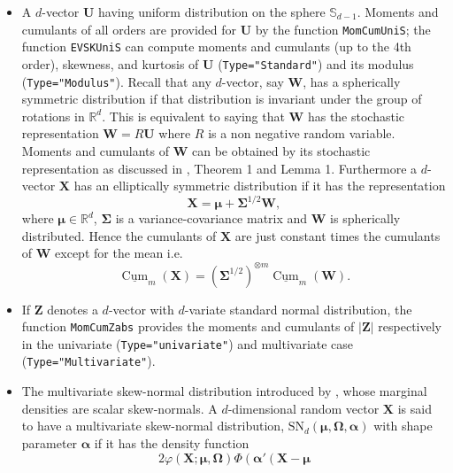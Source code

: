 \begin{itemize}
\item
  A \(d\)-vector \(\mathbf{U}\) having uniform distribution on the sphere \(\mathbb{S}_{d-1}\). Moments and cumulants of all orders are provided for \(\mathbf{U}\) by the function \texttt{MomCumUniS}; the function \texttt{EVSKUniS} can compute moments and cumulants (up to the 4th order), skewness, and kurtosis of \(\mathbf{U}\) (\texttt{Type="Standard"}) and its modulus (\texttt{Type="Modulus"}).
  Recall that any \(d\)-vector, say \(\mathbf{W}\), has a spherically symmetric distribution
  if that distribution is invariant under the group of rotations in
  \(\mathbb{R}^{d}\). This is equivalent to saying that \(\mathbf{W}\) has the
  stochastic representation \(\mathbf{W}=R\mathbf{U}\)
  where \(R\) is a non negative random variable. Moments and cumulants of \(\mathbf{W}\) can be obtained by its stochastic representation as discussed in \citet{jamma2021San}, Theorem 1 and Lemma 1. Furthermore a \(d\)-vector \(\mathbf{X}\) has an elliptically symmetric distribution if it has the representation
  \[
  \mathbf{X}=\boldsymbol{\mu}+\boldsymbol{\Sigma}^{1/2}\mathbf{W},%
  \]
  where \(\boldsymbol{\mu}\in\mathbb{R}^{d}\), \(\boldsymbol{\Sigma}\) is a
  variance-covariance matrix and \(\mathbf{W}\) is spherically distributed.
  Hence the cumulants of \(\mathbf{X}\) are just constant times the cumulants
  of \(\mathbf{W}\) except for the mean i.e.
  \[
  \underline{\operatorname*{Cum}}_{m}\left(  \mathbf{X}\right)  =\left(
  \boldsymbol{\Sigma}^{1/2}\right)  ^{\otimes m}\underline{\operatorname*{Cum}%
  }_{m}\left(  \mathbf{W}\right)  .
  \]
\item
  If \(\mathbf{Z}\) denotes a \(d\)-vector with \(d\)-variate standard normal distribution, the function \texttt{MomCumZabs} provides the moments and cumulants of \(|\mathbf{Z}|\) respectively in the univariate (\texttt{Type="univariate"}) and multivariate case (\texttt{Type="Multivariate"}).
\item
  The multivariate skew-normal distribution introduced by \citet{azzalini1996multivariate}, whose marginal densities
  are scalar skew-normals. A \(d\)-dimensional random vector \(\mathbf{X}\) is
  said to have a multivariate skew-normal distribution, \(\text{SN}_{d}\left(\boldsymbol{\mu},\boldsymbol{\Omega},\boldsymbol{\alpha}\right)\) with shape
  parameter \(\boldsymbol{\alpha}\) if it has the density function
  \[
  2\varphi\left(  \mathbf{X};\boldsymbol{\mu},\boldsymbol{\Omega}\right)
  \Phi\left(  \boldsymbol{\alpha}' \left(  \mathbf{X}-\boldsymbol{\mu
}\]
\end{itemize}
